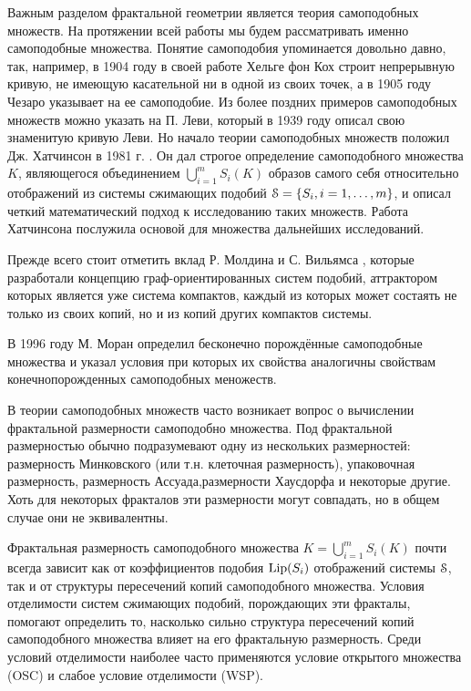 Важным разделом фрактальной геометрии является теория самоподобных множеств.
На протяжении всей работы мы будем рассматривать именно самоподобные множества.
Понятие самоподобия упоминается довольно давно, так, например, в 1904 году в своей работе \cite{Koch} Хельге фон Кох строит  непрерывную кривую, не имеющую касательной ни в одной из своих точек, а в 1905 году Чезаро \cite{Ces} указывает на ее самоподобие.
Из более поздних примеров самоподобных множеств можно указать на П. Леви, который в 1939 году \cite{Levy1939} описал свою знаменитую кривую Леви.
Но начало теории самоподобных множеств положил Дж. Хатчинсон в 1981 г. \cite{Hut1981}.
Он дал строгое определение самоподобного множества $K$, являющегося объединением $\bigcup_{i=1}^mS_i(K)$ образов самого себя относительно отображений из системы сжимающих подобий ${\EuScript S}=\{S_i, i=1,\ldots,m\}$, и описал четкий математический подход к исследованию таких множеств. 
Работа Хатчинсона послужила основой для множества дальнейших исследований.

Прежде всего стоит отметить вклад Р. Молдина и С. Вильямса \cite{MW1988}, которые разработали концепцию граф-ориентированных систем подобий, аттрактором которых является уже система компактов, каждый из которых может состаять не только из своих копий, но и из копий других компактов системы.

В 1996 году М. Моран \cite{Moran1996} определил бесконечно порождённые самоподобные множества и указал условия при которых их свойства аналогичны свойствам конечнопорожденных самоподобных меножеств.

В теории самоподобных множеств часто возникает вопрос о вычислении фрактальной размерности самоподобно множества.
Под фрактальной размерностью обычно подразумевают одну из нескольких размерностей: размерность Минковского (или т.н. клеточная размерность), упаковочная размерность, размерность Ассуада,размерности Хаусдорфа и некоторые другие.
Хоть для некоторых фракталов эти размерности могут совпадать, но в общем случае они не эквивалентны.

Фрактальная размерность самоподобного множества $K=\bigcup_{i=1}^mS_i(K)$ почти всегда зависит как от коэффициентов подобия $\mathop{\rm Lip} \nolimits(S_i)$ отображений системы ${\EuScript S}$, так и от структуры пересечений копий самоподобного множества.
Условия отделимости систем сжимающих подобий, порождающих эти фракталы, помогают определить то, насколько сильно структура пересечений копий самоподобного множества влияет на его фрактальную размерность.
Среди условий отделимости наиболее часто применяются условие открытого множества (OSC) и слабое условие отделимости (WSP).

